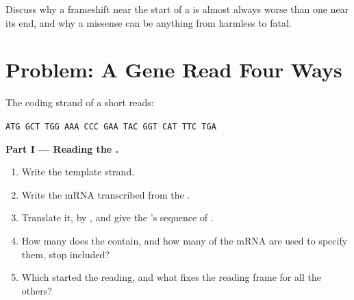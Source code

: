 \begin{exercise}[$\star\star\star$]\label{exo:g11:gene-expression:15}
Discuss why a frameshift near the start of a  is almost always
worse than one near its end, and why a missense  can be
anything from harmless to fatal.
\end{exercise}

\section{Problem: A Gene Read Four Ways}

\begin{problem}
\label{pb:g11:gene-expression:1}
The coding strand of a short  reads:
\begin{center}
\texttt{ATG GCT TGG AAA CCC GAA TAC GGT CAT TTC TGA}
\end{center}

\medskip
\noindent\textbf{Part I --- Reading the .}
\begin{enumerate}
  \item Write the template strand.
  \item Write the mRNA transcribed from the .
  \item Translate it,  by , and give the 's sequence
        of .
  \item How many  does the  contain, and how many
         of the mRNA are used to specify them, stop
        included?
  \item Which  started the reading, and what fixes the reading
        frame for all the others?
\end{enumerate}


\end{problem}
